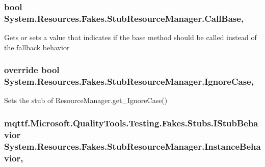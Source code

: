\hypertarget{class_system_1_1_resources_1_1_fakes_1_1_stub_resource_manager_ac04a997d22a9d0b7720d1cada049090d}{
\subsubsection[{Call\-Base}]{\setlength{\rightskip}{0pt plus 5cm}bool System.\-Resources.\-Fakes.\-Stub\-Resource\-Manager.\-Call\-Base\hspace{0.3cm}{\ttfamily [get]}, {\ttfamily [set]}}}\label{class_system_1_1_resources_1_1_fakes_1_1_stub_resource_manager_ac04a997d22a9d0b7720d1cada049090d}


Gets or sets a value that indicates if the base method should be called instead of the fallback behavior

\hypertarget{class_system_1_1_resources_1_1_fakes_1_1_stub_resource_manager_a535fc71bed9718a32c2a5dff6a54eff5}{
\subsubsection[{Ignore\-Case}]{\setlength{\rightskip}{0pt plus 5cm}override bool System.\-Resources.\-Fakes.\-Stub\-Resource\-Manager.\-Ignore\-Case\hspace{0.3cm}{\ttfamily [get]}, {\ttfamily [set]}}}\label{class_system_1_1_resources_1_1_fakes_1_1_stub_resource_manager_a535fc71bed9718a32c2a5dff6a54eff5}


Sets the stub of Resource\-Manager.\-get\-\_\-\-Ignore\-Case()

\hypertarget{class_system_1_1_resources_1_1_fakes_1_1_stub_resource_manager_af627e585dc65987ccada62113ffe17ed}{
\subsubsection[{Instance\-Behavior}]{\setlength{\rightskip}{0pt plus 5cm}mqttf.\-Microsoft.\-Quality\-Tools.\-Testing.\-Fakes.\-Stubs.\-I\-Stub\-Behavior System.\-Resources.\-Fakes.\-Stub\-Resource\-Manager.\-Instance\-Behavior\hspace{0.3cm}{\ttfamily [get]}, {\ttfamily [set]}}}\label{class_system_1_1_resources_1_1_fakes_1_1_stub_resource_manager_af627e585dc65987ccada62113ffe17ed}


